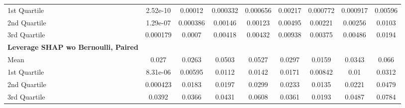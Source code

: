 {\begin{tabular} {lcccccccc}
\hspace{7pt}1st Quartile & \cellcolor{bronze!60}2.52e-10 & \cellcolor{bronze!60}0.00012 & \cellcolor{silver!60}0.000332 & \cellcolor{silver!60}0.000656 & \cellcolor{gold!60}0.00217 & \cellcolor{gold!60}0.000772 & \cellcolor{gold!60}0.000917 & \cellcolor{gold!60}0.00596 \\ 
\hspace{7pt}2nd Quartile & 1.29e-07 & \cellcolor{bronze!60}0.000386 & \cellcolor{silver!60}0.00146 & \cellcolor{gold!60}0.00123 & \cellcolor{gold!60}0.00495 & \cellcolor{gold!60}0.00221 & \cellcolor{gold!60}0.00256 & \cellcolor{gold!60}0.0103 \\ 
\hspace{7pt}3rd Quartile & \cellcolor{bronze!60}0.000179 & \cellcolor{silver!60}0.0007 & \cellcolor{silver!60}0.00418 & \cellcolor{silver!60}0.00432 & \cellcolor{silver!60}0.00938 & \cellcolor{gold!60}0.00375 & \cellcolor{gold!60}0.00486 & \cellcolor{gold!60}0.0194 \\ 
\addlinespace[1ex] 
\textbf{Leverage SHAP wo Bernoulli, Paired} &  &  &  &  &  &  &  &  \\ 
\hspace{7pt}Mean & 0.027 & 0.0263 & 0.0503 & 0.0527 & 0.0297 & 0.0159 & 0.0343 & 0.066 \\ 
\hspace{7pt}1st Quartile & 8.31e-06 & 0.00595 & 0.0112 & 0.0142 & 0.0171 & 0.00842 & 0.01 & 0.0312 \\ 
\hspace{7pt}2nd Quartile & 0.000423 & 0.0183 & 0.0197 & 0.0299 & 0.0233 & 0.0135 & 0.0221 & 0.0479 \\ 
\hspace{7pt}3rd Quartile & 0.0392 & 0.0366 & 0.0431 & 0.0608 & 0.0361 & 0.0193 & 0.0487 & 0.0784 \\ 
\bottomrule
\end{tabular}}